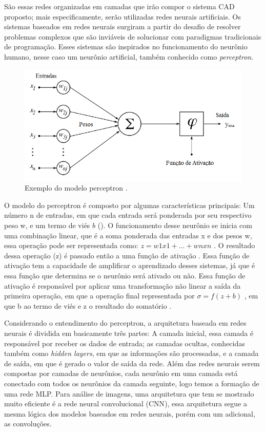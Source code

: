 São essas redes organizadas em camadas que irão compor o sistema CAD proposto; mais especificamente, serão utilizadas redes neurais artificiais. Os sistemas baseados em redes neurais surgiram a partir do desafio de resolver problemas complexos que são inviáveis de solucionar com paradigmas tradicionais de programação. Esses sistemas são inspirados no funcionamento do neurônio humano, nesse caso um neurônio artificial, também conhecido como \textit{perceptron}.

\begin{figure}[h]
\centering\includegraphics[scale=0.4]{images/Figura-1-neuronio-artificial.png}
\caption{Exemplo do modelo perceptron \cite{imagemperceptron}.}
\label{fig: perceptron}
\end{figure}

O modelo do perceptron é composto por algumas características principais: Um número n de entradas, em que cada entrada será ponderada por seu respectivo peso w, e um termo de viés \(b\) (). O funcionamento desse neurônio se inicia com uma combinação linear, que é a soma ponderada das entradas x e dos pesos w, essa operação pode ser representada como: \(z = w1  x1 + ... + wn  xn\)  . O resultado dessa operação (z) é passado então a uma função de ativação . Essa função de ativação tem a capacidade de amplificar o aprendizado desses sistemas, já que é essa função que determina se o neurônio será ativado ou não. Essa função de ativação é responsável por aplicar uma transformação não linear a saída da primeira operação, em que a operação final representada por \(  \sigma  = f(z + b)\) , em que b ao termo de viés e z o resultado do somatório \cite{haykin2009neural}. 


Considerando o entendimento do perceptron, a arquitetura baseada em redes neurais é dividida em basicamente três partes: A camada inicial, essa camada é responsável por receber os dados de entrada; as camadas ocultas, conhecidas também como \textit{hidden layers}, em que as informações são processadas, e a camada de saída, em que é gerado o valor de saída da rede. Além das redes neurais serem compostas por camadas de neurônios, cada neurônio em uma camada está conectado com todos os neurônios da camada seguinte, logo temos a formação de uma rede \ac{MLP}. Para análise de imagens, uma arquitetura que tem se mostrado muito eficiente é a rede neural convolucional (\ac{CNN}), essa arquitetura segue a mesma lógica dos modelos baseados em redes neurais, porém com um adicional, as convoluções. 

